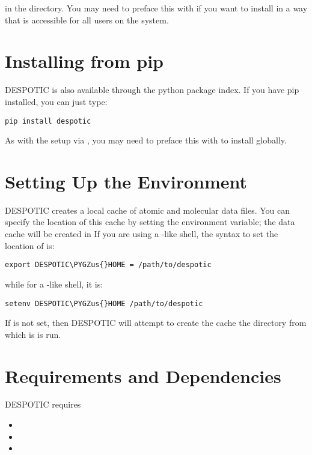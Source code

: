 \documentclass[letterpaper,10pt,english]{sphinxmanual}
\def\PYGZus{\char`\_}
\begin{document}
in the  directory. You may need to preface this with
 if you want to install in a way that is accessible for all
users on the system.


\section{Installing from pip}
\label{installation:installing-from-pip}
DESPOTIC is also available through the python package index. If you
have pip installed, you can just type:

\begin{Verbatim}[commandchars=\\\{\}]
pip install despotic
\end{Verbatim}

As with the setup via , you may need to preface this with
 to install globally.


\section{Setting Up the Environment}
\label{installation:setting-up-the-environment}
DESPOTIC creates a local cache of atomic and molecular data files. You
can specify the location of this cache by setting the
 environment variable; the data cache will be
created in  If you are using a -like
shell, the syntax to set the location of  is:

\begin{Verbatim}[commandchars=\\\{\}]
export DESPOTIC\PYGZus{}HOME = /path/to/despotic
\end{Verbatim}

while for a -like shell, it is:

\begin{Verbatim}[commandchars=\\\{\}]
setenv DESPOTIC\PYGZus{}HOME /path/to/despotic
\end{Verbatim}

If  is not set, then DESPOTIC will attempt to create
the cache the directory from which is is run.


\section{Requirements and Dependencies}
\label{installation:requirements-and-dependencies}
DESPOTIC requires
\begin{itemize}
\item {} 

\item {} 

\item {} 

\end{itemize}
\end{document}
